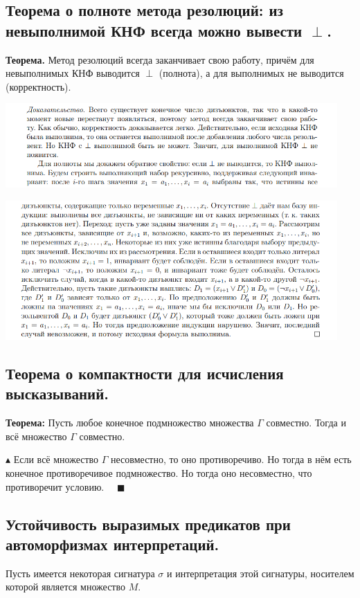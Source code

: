 \subsection{Теорема о полноте метода резолюций: из невыполнимой КНФ всегда можно вывести $\perp$.}

\textbf{Теорема.} Метод резолюций всегда заканчивает свою работу, причём для невыполнимых КНФ выводится $\perp$ (полнота), а для выполнимых не выводится (корректность).

\includegraphics[width=0.95\textwidth]{images/resolut_proof_1.png}

\includegraphics[width=0.95\textwidth]{images/resolut_proof_2.png}


\subsection{Теорема о компактности для исчисления высказываний.}

\textbf{Теорема:} Пусть любое конечное подмножество множества $\Gamma$ совместно. Тогда и всё множество $\Gamma$ совместно.

$\blacktriangle$ Если всё множество $\Gamma$ несовместно, то оно противоречиво. Но тогда в нём есть конечное противоречивое подмножество. Но тогда оно несовместно, что противоречит условию. $\quad \blacksquare$

\subsection{Устойчивость выразимых предикатов при автоморфизмах интерпретаций.}

Пусть имеется некоторая сигнатура $\sigma$ и интерпретация этой сигнатуры, носителем которой является множество $M$.

